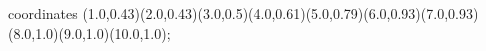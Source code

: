 					coordinates { (1.0,0.43)(2.0,0.43)(3.0,0.5)(4.0,0.61)(5.0,0.79)(6.0,0.93)(7.0,0.93)(8.0,1.0)(9.0,1.0)(10.0,1.0)};